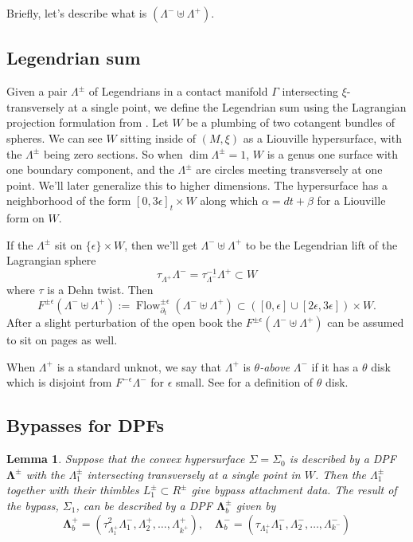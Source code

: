 \documentclass[11pt]{amsart}
\DeclareMathOperator{\Flow}{Flow}
\newcommand{\thicc}[1]{\pmb{#1}}
\newcommand{\Leg}{\Lambda}
\newcommand{\Mxi}{(M,\xi)}
\newcommand{\posNegRegion}{R^{\pm}}
\newcommand{\Lag}{L}
\newcommand{\posNegLag}{\Lag^{\pm}}
\newcommand{\posLeg}{\Leg^{+}}
\newcommand{\negLeg}{\Leg^{-}}
\newcommand{\thiccPosLeg}{\thicc{\Leg}^{+}}
\newcommand{\thiccNegLeg}{\thicc{\Leg}^{-}}
\newcommand{\thiccPosNegLeg}{\thicc{\Leg}^{\pm}}
\newcommand{\posNegLeg}{\Leg^{\pm}}
\newcommand{\divSet}{\Gamma}
\newtheorem{lemma}[thm]{Lemma}
\begin{document}
Briefly, let's describe what is $(\negLeg \uplus \posLeg)$.

\subsection{Legendrian sum}

Given a pair $\posNegLeg$ of Legendrians in a contact manifold $\divSet$ intersecting $\xi$-transversely at a single point, we define the Legendrian sum using the Lagrangian projection formulation from \cite[\S 4.1.2]{HH:Bypass}. Let $W$ be a plumbing of two cotangent bundles of spheres. We can see $W$ sitting inside of $\Mxi$ as a Liouville hypersurface, with the $\posNegLeg$ being zero sections. So when $\dim \posNegLeg = 1$, $W$ is a genus one surface with one boundary component, and the $\posNegLeg$ are circles meeting transversely at one point. We'll later generalize this to higher dimensions. The hypersurface has a neighborhood of the form $[0, 3\epsilon]_{t} \times W$ along which $\alpha = dt + \beta$ for a Liouville form on $W$.

 If the $\posNegLeg$ sit on $\{ \epsilon \} \times W$, then we'll get $\negLeg \uplus \posLeg$ to be the Legendrian lift of the Lagrangian sphere
\begin{equation*}
 \tau_{\posLeg} \negLeg = \tau_{\negLeg}^{-1} \posLeg \subset W
\end{equation*}
where $\tau$ is a Dehn twist. Then
\begin{equation*}
F^{\pm\epsilon}(\negLeg \uplus \posLeg) := \Flow_{\partial_{t}}^{\pm \epsilon}(\negLeg \uplus \posLeg) \subset ([0, \epsilon] \cup [2\epsilon, 3\epsilon]) \times W.
\end{equation*}
After a slight perturbation of the open book the $F^{\pm \epsilon}(\negLeg \uplus \posLeg)$ can be assumed to sit on pages as well.

When $\posLeg$ is a standard unknot, we say that $\posLeg$ is \emph{$\theta$-above} $\negLeg$ if it has a $\theta$ disk which is disjoint from $F^{-\epsilon}\negLeg$ for $\epsilon$ small. See \cite{HH:Bypass} for a definition of $\theta$ disk.

\subsection{Bypasses for DPFs}

\begin{lemma}\label{Lemma:OBBypass}
Suppose that the convex hypersurface $\Sigma = \Sigma_{0}$ is described by a DPF $\thiccPosNegLeg$ with the $\posNegLeg_{1}$ intersecting transversely at a single point in $W$. Then the $\posNegLeg_{1}$ together with their thimbles $\posNegLag_{1} \subset \posNegRegion$ give bypass attachment data. The result of the bypass, $\Sigma_{1}$, can be described by a DPF $\thiccPosNegLeg_{b}$ given by
\begin{equation*}
\thiccPosLeg_{b} = (\tau_{\posLeg_{1}}^{2}\negLeg_{1}, \posLeg_{2}, \dots, \posLeg_{k^{+}}), \quad \thiccNegLeg_{b} = (\tau_{\posLeg_{1}}\negLeg_{1}, \negLeg_{2}, \dots, \negLeg_{k^{-}})
\end{equation*}
\end{lemma}
\end{document}
